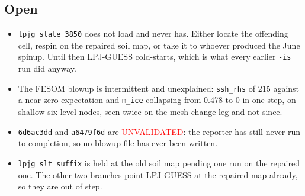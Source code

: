 \documentclass[11pt,a4paper]{article}
\newcommand{\code}[1]{\texttt{\small #1}}
\begin{document}
\subsection{Open}

\begin{itemize}
\item \code{lpjg\_state\_3850} does not load and never has. Either locate the offending cell,
respin on the repaired soil map, or take it to whoever produced the June spinup. Until then
LPJ-GUESS cold-starts, which is what every earlier \code{-is} run did anyway.
\item The FESOM blowup is intermittent and unexplained: \code{ssh\_rhs} of 215 against a
near-zero expectation and \code{m\_ice} collapsing from 0.478 to 0 in one step, on shallow
six-level nodes, seen twice on the mesh-change leg and not since.
\item \code{6d6ac3dd} and \code{a6479f6d} are \textcolor{red}{UNVALIDATED}: the reporter has
still never run to completion, so no blowup file has ever been written.
\item \code{lpjg\_slt\_suffix} is held at the old soil map pending one run on the repaired one.
The other two branches point LPJ-GUESS at the repaired map already, so they are out of step.
\end{itemize}
\end{document}
